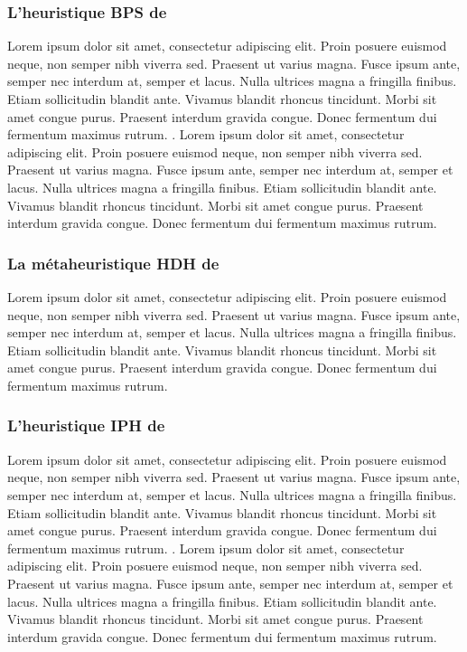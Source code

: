 \medskip

\subsubsection{L'heuristique BPS de \parencite{bertazzi_improved_2004}}
Lorem ipsum dolor sit amet, consectetur adipiscing elit. Proin posuere euismod neque, non semper nibh viverra sed. Praesent ut varius magna. Fusce ipsum ante, semper nec interdum at, semper et lacus. Nulla ultrices magna a fringilla finibus. Etiam sollicitudin blandit ante. Vivamus blandit rhoncus tincidunt. Morbi sit amet congue purus. Praesent interdum gravida congue. Donec fermentum dui fermentum maximus rutrum. \parencite{paletta_period_2002}. Lorem ipsum dolor sit amet, consectetur adipiscing elit. Proin posuere euismod neque, non semper nibh viverra sed. Praesent ut varius magna. Fusce ipsum ante, semper nec interdum at, semper et lacus. Nulla ultrices magna a fringilla finibus. Etiam sollicitudin blandit ante. Vivamus blandit rhoncus tincidunt. Morbi sit amet congue purus. Praesent interdum gravida congue. Donec fermentum dui fermentum maximus rutrum.

\medskip

\subsubsection{La métaheuristique HDH de \parencite{hemmelmayr_variable_2009}}
\label{sub-sec:hdh}
Lorem ipsum dolor sit amet, consectetur adipiscing elit. Proin posuere euismod neque, non semper nibh viverra sed. Praesent ut varius magna. Fusce ipsum ante, semper nec interdum at, semper et lacus. Nulla ultrices magna a fringilla finibus. Etiam sollicitudin blandit ante. Vivamus blandit rhoncus tincidunt. Morbi sit amet congue purus. Praesent interdum gravida congue. Donec fermentum dui fermentum maximus rutrum.
\medskip

\subsubsection{L'heuristique IPH de \parencite{gulczynski_period_2011}}
Lorem ipsum dolor sit amet, consectetur adipiscing elit. Proin posuere euismod neque, non semper nibh viverra sed. Praesent ut varius magna. Fusce ipsum ante, semper nec interdum at, semper et lacus. Nulla ultrices magna a fringilla finibus. Etiam sollicitudin blandit ante. Vivamus blandit rhoncus tincidunt. Morbi sit amet congue purus. Praesent interdum gravida congue. Donec fermentum dui fermentum maximus rutrum. \parencite{chao_new_1995}. Lorem ipsum dolor sit amet, consectetur adipiscing elit. Proin posuere euismod neque, non semper nibh viverra sed. Praesent ut varius magna. Fusce ipsum ante, semper nec interdum at, semper et lacus. Nulla ultrices magna a fringilla finibus. Etiam sollicitudin blandit ante. Vivamus blandit rhoncus tincidunt. Morbi sit amet congue purus. Praesent interdum gravida congue. Donec fermentum dui fermentum maximus rutrum.

